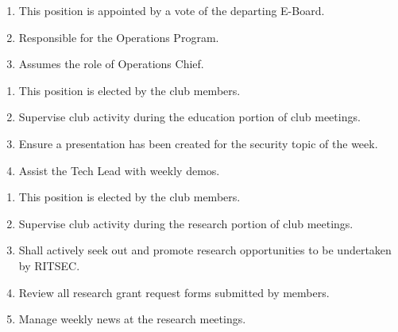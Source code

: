 \begin{enumerate}
  \item This position is appointed by a vote of the departing E-Board.
  \item Responsible for the Operations Program.
  \item Assumes the role of Operations Chief.
\end{enumerate}


\begin{enumerate}
  \item This position is elected by the club members.
  \item Supervise club activity during the education portion of club meetings.
  \item Ensure a presentation has been created for the security topic of the week.
  \item Assist the Tech Lead with weekly demos.
\end{enumerate}


\begin{enumerate}
  \item This position is elected by the club members.
  \item Supervise club activity during the research portion of club meetings.
  \item Shall actively seek out and promote research opportunities to be undertaken by RITSEC.
  \item Review all research grant request forms submitted by members. 
  \item Manage weekly news at the research meetings.
\end{enumerate}
